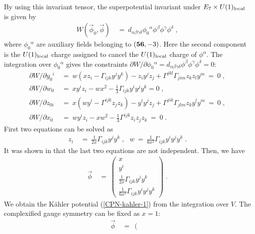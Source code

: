 \documentclass[a4paper,11pt]{article}
\newcommand{\del}{\partial}
\newcommand{\kahler}{K\"{a}hler }
\newcommand{\bsubeq}{\begin{subequations}}
\newcommand{\esubeq}{\end{subequations}}
\begin{document}
{By using this invariant tensor,
the superpotential invariant under 
$E_7 \times U(1)_{\rm local}$ is given by 
\begin{align}
W (\vec{\phi}_0, \vec{\phi}) 
\ &= \ d_{\alpha \beta \gamma \delta} 
  {\phi_0}^{\alpha} \phi^{\beta} \phi^{\gamma} \phi^{\delta} \; ,
\end{align}
where $\phi_0{}^{\alpha}$ are auxiliary fields 
belonging to $({\bf 56},-3)$. 
Here the second component is the $U(1)_{\rm local}$ charge 
assigned to cancel the  $U(1)_{\rm local}$ charge of $\phi^{\alpha}$.
The integration over $\phi_0{}^{\alpha}$ gives 
the constraints $\del W / \del \phi_0{}^{\alpha} = 
d_{\alpha \beta \gamma \delta} 
\phi^{\beta} \phi^{\gamma} \phi^{\delta} = 0$:
\bsubeq \label{E7_F-flat}
\begin{align}
\del W / \del {y_0}^i
\ &= \ w (x z_i - \Gamma_{ijk} y^j y^k) - z_i y^j z_j
  + \Gamma^{jkl} \Gamma_{jim} z_k z_l y^m \ = \ 0 \; , \\
\del W / \del w_0
\ &= \ x y^i z_i - w x^2 -\frac{1}{3} \Gamma_{ijk} y^i y^j y^k =
0 \; , \\
\del W / \del z_{0 i} 
\ &= \ x (w y^i - \Gamma^{ijk} z_j z_k) - y^i y^j z_j
  + \Gamma^{jik} \Gamma_{jlm} z_k y^l y^m \ = \ 0 \; , \\
\del W / \del x_0 
\ &= \ w y^i z_i - x w^2 -\frac{1}{3} \Gamma^{ijk} z_i
z_j z_k \ = \ 0 \; . 
\end{align}
\esubeq
First two equations can be solved as~\cite{HN1}
\begin{align}
z_i \ &= \ 
\frac{1}{2 x} \Gamma_{ijk} y^j y^k \; , \ \ \ 
 w \ = \ 
\frac{1}{6 x^2} \Gamma_{ijk} y^i y^j y^k \; . 
\label{E7-ans.}
\end{align}
It was shown in \cite{HN1} 
that the last two equations are not independent.
Then, we have 
\begin{align}
 \vec{\phi} \ &= \ \left(
\begin{array}{c}
x \\
y^i \\
\frac{1}{2x} \Gamma_{ijk} y^j y^k \\
\frac{1}{6x^2} \Gamma_{ijk} y^i y^j y^k
\end{array} \right) \; . \label{E7_F-flat2}
\end{align}
We obtain the \kahler potential (\ref{CPN-kahler-1}) from 
the integration over $V$.
The complexified gauge symmetry can be fixed as $x=1$: 
\begin{align}
\vec{\phi} \ &= \ \left(
\begin{array}{c}

\end{array}
\end{align}}
\end{document}
